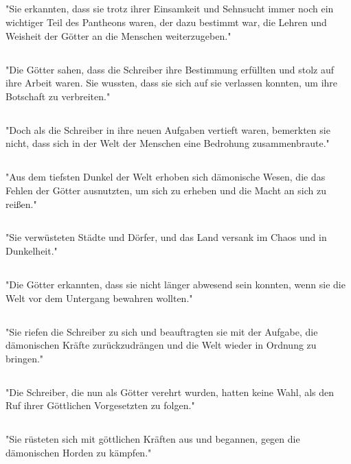 \documentclass{article}
\begin{document}
\subsection{}
"Sie erkannten, dass sie trotz ihrer Einsamkeit und Sehnsucht immer noch ein wichtiger Teil des Pantheons waren, der dazu bestimmt war, die Lehren und Weisheit der Götter an die Menschen weiterzugeben."
\subsection{}
"Die Götter sahen, dass die Schreiber ihre Bestimmung erfüllten und stolz auf ihre Arbeit waren. Sie wussten, dass sie sich auf sie verlassen konnten, um ihre Botschaft zu verbreiten."
\subsection{}
"Doch als die Schreiber in ihre neuen Aufgaben vertieft waren, bemerkten sie nicht, dass sich in der Welt der Menschen eine Bedrohung zusammenbraute."
\subsection{}
"Aus dem tiefsten Dunkel der Welt erhoben sich dämonische Wesen, die das Fehlen der Götter ausnutzten, um sich zu erheben und die Macht an sich zu reißen."
\subsection{}
"Sie verwüsteten Städte und Dörfer, und das Land versank im Chaos und in Dunkelheit."
\subsection{}
"Die Götter erkannten, dass sie nicht länger abwesend sein konnten, wenn sie die Welt vor dem Untergang bewahren wollten."
\subsection{}
"Sie riefen die Schreiber zu sich und beauftragten sie mit der Aufgabe, die dämonischen Kräfte zurückzudrängen und die Welt wieder in Ordnung zu bringen."
\subsection{}
"Die Schreiber, die nun als Götter verehrt wurden, hatten keine Wahl, als den Ruf ihrer Göttlichen Vorgesetzten zu folgen."
\subsection{}
"Sie rüsteten sich mit göttlichen Kräften aus und begannen, gegen die dämonischen Horden zu kämpfen."
\end{document}
